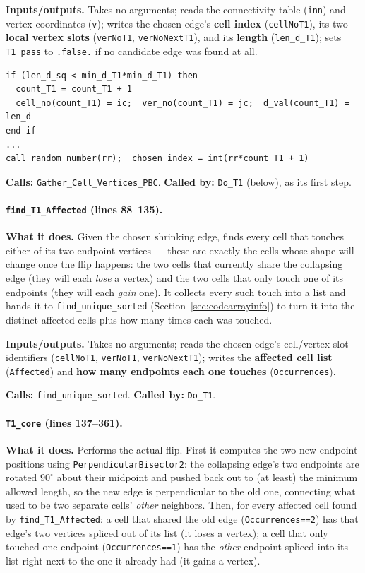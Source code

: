 \documentclass[11pt]{article}
\begin{document}
\textbf{Inputs/outputs.} Takes no arguments; reads the connectivity table
(\texttt{inn}) and vertex coordinates (\texttt{v}); writes the chosen edge's
\textbf{cell index} (\texttt{cellNoT1}), its two \textbf{local vertex slots}
(\texttt{verNoT1}, \texttt{verNoNextT1}), and its \textbf{length} (\texttt{len\_d\_T1});
sets \texttt{T1\_pass} to \texttt{.false.} if no candidate edge was found at all.

\begin{lstlisting}[caption={Collecting short-edge candidates and picking one at random, in \texttt{find\_T1}.}]
if (len_d_sq < min_d_T1*min_d_T1) then
  count_T1 = count_T1 + 1
  cell_no(count_T1) = ic;  ver_no(count_T1) = jc;  d_val(count_T1) = len_d
end if
...
call random_number(rr);  chosen_index = int(rr*count_T1 + 1)
\end{lstlisting}

\textbf{Calls:} \texttt{Gather\_Cell\_Vertices\_PBC}. \textbf{Called by:} \texttt{Do\_T1}
(below), as its first step.

\paragraph{\texttt{find\_T1\_Affected} (lines 88--135).}
\textbf{What it does.} Given the chosen shrinking edge, finds every cell that touches
either of its two endpoint vertices --- these are exactly the cells whose shape will
change once the flip happens: the two cells that currently share the collapsing edge
(they will each \emph{lose} a vertex) and the two cells that only touch one of its
endpoints (they will each \emph{gain} one). It collects every such touch into a list
and hands it to \texttt{find\_unique\_sorted} (Section~\ref{sec:codearrayinfo}) to turn
it into the distinct affected cells plus how many times each was touched.

\textbf{Inputs/outputs.} Takes no arguments; reads the chosen edge's cell/vertex-slot
identifiers (\texttt{cellNoT1}, \texttt{verNoT1}, \texttt{verNoNextT1}); writes the
\textbf{affected cell list} (\texttt{Affected}) and \textbf{how many endpoints each one
touches} (\texttt{Occurrences}).

\textbf{Calls:} \texttt{find\_unique\_sorted}. \textbf{Called by:} \texttt{Do\_T1}.

\paragraph{\texttt{T1\_core} (lines 137--361).}
\textbf{What it does.} Performs the actual flip. First it computes the two new
endpoint positions using \texttt{PerpendicularBisector2}: the collapsing edge's two
endpoints are rotated $90^\circ$ about their midpoint and pushed back out to (at least)
the minimum allowed length, so the new edge is perpendicular to the old one, connecting
what used to be two separate cells' \emph{other} neighbors. Then, for every affected
cell found by \texttt{find\_T1\_Affected}: a cell that shared the old edge
(\texttt{Occurrences==2}) has that edge's two vertices spliced out of its list (it
loses a vertex); a cell that only touched one endpoint (\texttt{Occurrences==1}) has
the \emph{other} endpoint spliced into its list right next to the one it already had
(it gains a vertex).
\end{document}
